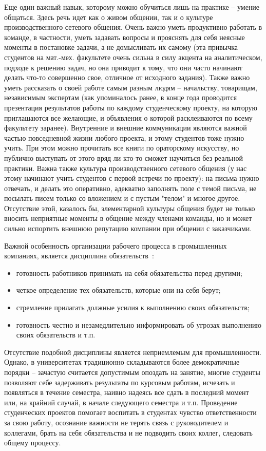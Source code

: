 \documentclass[a5paper]{article}
\begin{document}
Еще один важный навык, которому можно обучиться лишь на практике -- умение общаться. Здесь речь идет как о живом общении, так и о культуре производственного сетевого общения.  Очень важно уметь продуктивно работать в команде, в частности, уметь задавать вопросы и прояснять для себя неясные моменты в постановке задачи, а не домысливать их самому (эта привычка студентов на мат.-мех. факультете очень сильна в силу акцента на аналитическом, подходе к решению задач, но она приводит к тому, что они часто начинают делать что-то совершенно свое, отличное от исходного задания). Также важно уметь рассказать о своей работе самым разным людям -- начальству, товарищам, независимым экспертам (как упоминалось ранее, в конце года проводится презентация результатов работы по каждому студенческому проекту, на которую приглашаются все желающие, и объявления о которой расклеиваются по всему факультету заранее). Внутренние и внешние коммуникации являются важной частью повседневной жизни любого проекта, и этому студентов тоже нужно учить. При этом можно прочитать все книги по ораторскому искусству, но публично выступать от этого вряд ли кто-то сможет научиться без реальной практики. Важна также культура производственного сетевого общения (у нас этому начинают учить студентов с первой встречи по проекту): на письма нужно отвечать, и делать это оперативно, адекватно заполнять поле с темой письма, не посылать писем только со вложением и с пустым "телом" и многое другое. Отсутствие этой, казалось бы, элементарной культуры общения будет не только вносить неприятные моменты в общение между членами команды, но и может сильно испортить внешнюю репутацию компании при общении с заказчиками.

Важной особенность организации рабочего процесса в промышленных компаниях, является дисциплина обязательств~\cite{ obyzat}:
\begin{itemize}
 \item готовность работников принимать на себя обязательства перед другими;
 \item четкое определение тех обязательств, которые они на себя берут;
 \item стремление прилагать должные усилия к выполнению своих обязательств;
 \item готовность честно и незамедлительно информировать об угрозах выполнению своих обязательств и т.п.
\end{itemize}
Отсутствие подобной дисциплины является неприемлемым для промышленности. Однако, в университетах традиционно складываются более демократичные порядки -- зачастую считается допустимым опоздать на занятие, многие студенты позволяют себе задерживать результаты по курсовым работам, исчезать и появляться в течение семестра, наивно надеясь все сдать в последний момент или, на крайний случай, в начале следующего семестра и т.п. Проведение студенческих проектов помогает воспитать в студентах чувство ответственности за свою работу, осознание важности не терять связь с руководителем и коллегами, брать на себя обязательства и не подводить своих коллег, следовать общему процессу.
\end{document}
